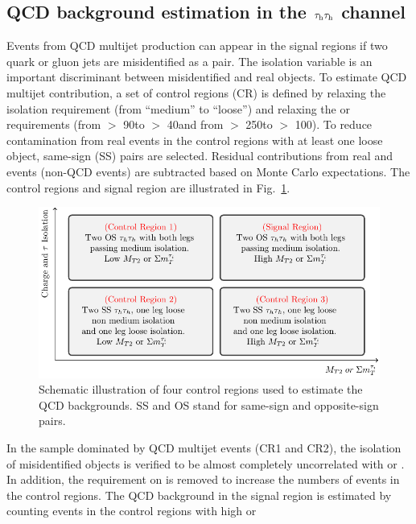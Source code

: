 \subsection{\texorpdfstring{QCD background estimation in the $\tau_{\rm h}\tau_{\rm h}$ channel}{QCD background estimation in the tau-tau channel}}
\label{sect:bkgQCD}
Events from QCD multijet production can appear in the signal regions 
if two quark or gluon jets are misidentified as a \tauTau pair.
The isolation variable is an important 
discriminant between misidentified and real \Tau objects. To estimate QCD multijet contribution, a set of \tauTau control regions (CR) is defined 
by relaxing the \Tau isolation requirement (from ``medium'' to ``loose'') 
and relaxing the \mttwo or \SumMT requirements (from \mttwo $>$ 90\GeV to \mttwo $>$ 40\GeV and from \SumMT $>$ 250\GeV to \SumMT $>$ 100\GeV). 
To reduce contamination from real \tauTau events 
in the control regions with at least one loose \Tau object, 
same-sign (SS) \tauTau pairs are selected. Residual contributions from real 
\tauTau and \wjets events (non-QCD events) are subtracted based on Monte Carlo expectations. 
The control regions and signal region are 
illustrated in Fig.~\ref{fig:ABCDQCD}. 
\begin{figure}[!htb]
\centering
\includegraphics[angle=0,scale=1.15]{Bkg/ABCD.pdf}
\caption{Schematic illustration of four control regions used to estimate the QCD backgrounds. SS and OS stand for same-sign and opposite-sign pairs.}
\label{fig:ABCDQCD}
\end{figure}
In the sample dominated by QCD multijet events (CR1 and CR2), the isolation of misidentified \Tau objects is verified 
to be almost completely uncorrelated with \mttwo or \SumMT.
In addition, the requirement on \deltaphi
is removed to increase the numbers of events in the control regions. 
The QCD background in the signal region is estimated by counting events in the control regions with high \mttwo or \SumMT  
